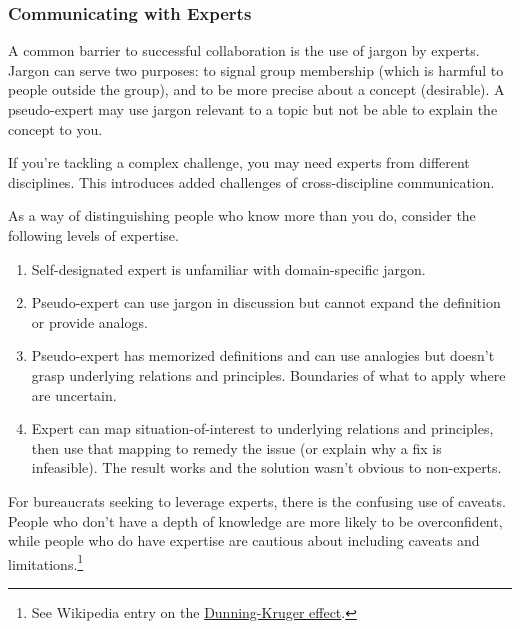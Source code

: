 \subsubsection*{Communicating with Experts}
A common barrier to successful collaboration is the use of jargon by experts.
Jargon can serve two purposes: to signal group membership (which is harmful to people outside the group), and to be more precise about a concept (desirable). A pseudo-expert may use jargon relevant to a topic but not be able to explain the concept to you.

If you're tackling a complex challenge, you may need experts from different disciplines. This introduces added challenges of cross-discipline communication. 

As a way of distinguishing people who know more than you do, consider the following levels of expertise.
\begin{enumerate}
    \item Self-designated expert is unfamiliar with domain-specific jargon.
    \item Pseudo-expert can use jargon in discussion but cannot expand the definition or provide analogs.
    \item Pseudo-expert has memorized definitions and can use analogies but doesn't grasp underlying relations and principles. Boundaries of what to apply where are uncertain.
    \item Expert can map situation-of-interest to underlying relations and principles, then use that mapping to remedy the issue (or explain why a fix is infeasible). The result works and the solution wasn't obvious to non-experts.
\end{enumerate}

For bureaucrats seeking to leverage experts, there is the confusing use of caveats. People who don't have a depth of knowledge are more likely to be overconfident, while people who do have expertise are cautious about including caveats and limitations.\footnote{See Wikipedia entry on the \href{https://en.wikipedia.org/wiki/Dunning\%E2\%80\%93Kruger_effect}{Dunning-Kruger effect}.
}



